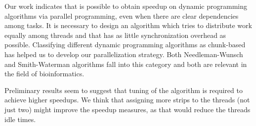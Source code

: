 \documentclass[journal]{IEEEtran}
\begin{document}
Our work indicates that is possible to obtain speedup on dynamic programming algorithms via parallel programming, even when there are clear dependencies among tasks. It is necessary to design an algorithm which tries to distribute work equally among threads and that has as little synchronization overhead as possible. Classifying different dynamic programming algorithms as chunk-based has helped us to develop our parallelization strategy. Both Needleman-Wunsch and Smith-Waterman algorithms fall into this category and both are relevant in the field of bioinformatics.

Preliminary results seem to suggest that tuning of the algorithm is required to achieve higher speedups. We think that assigning more strips to the threads (not just two) might improve the speedup measures, as that would reduce the threads idle times. 


\ifCLASSOPTIONcaptionsoff
  \newpage
\fi

%
%
\end{document}
